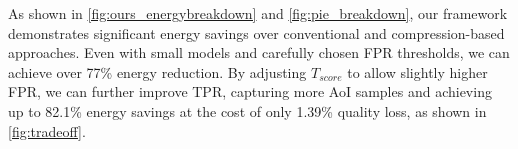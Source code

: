 As shown in \autoref{fig:ours_energybreakdown} and \autoref{fig:pie_breakdown}, our framework demonstrates significant energy savings over conventional and compression-based approaches. Even with small models and carefully chosen FPR thresholds, we can achieve over 77\% energy reduction. By adjusting $T_{score}$ to allow slightly higher FPR, we can further improve TPR, capturing more AoI samples and achieving up to 82.1\% energy savings at the cost of only 1.39\% quality loss, as shown in \autoref{fig:tradeoff}.



